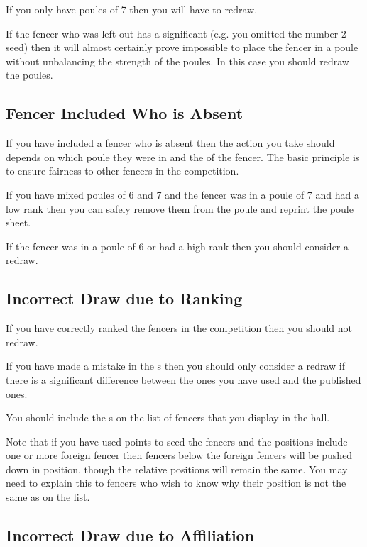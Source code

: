 \documentclass[a4paper,11pt]{memoir}
\begin{document}
If you only have poules of 7 then you will have to redraw.

If the fencer who was left out has a significant  (e.g. you omitted the number 2 seed) then it will almost certainly prove impossible to place the fencer in a poule without unbalancing the strength of the poules. In this case you should redraw the poules.

\subsection{Fencer Included Who is Absent}

If you have included a fencer who is absent then the action you take should depends on which poule they were in and the  of the fencer. The basic principle is to ensure fairness to other fencers in the competition.

If you have mixed poules of 6 and 7 and the fencer was in a poule of 7 and had a low rank then you can safely remove them from the poule and reprint the poule sheet.

If the fencer was in a poule of 6 or had a high rank then you should consider a redraw. 

\subsection{Incorrect Draw due to Ranking}

If you have correctly ranked the fencers in the competition then you should not redraw. 

If you have made a mistake in the s then you should only consider a redraw if there is a significant difference between the ones you have used and the published ones.

You should include the s on the list of fencers that you display in the hall.

Note that if you have used  points to \gls{seed} the fencers and the positions include one or more foreign fencer then fencers below the foreign fencers will be pushed down in position, though the relative positions will remain the same. You may need to explain this to fencers who wish to know why their position is not the same as on the  list.  

\subsection{Incorrect Draw due to Affiliation}
\end{document}
